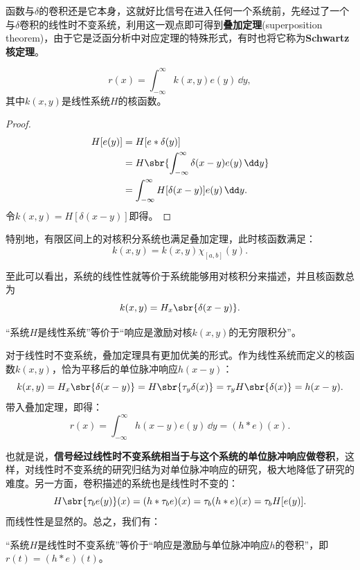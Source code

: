 函数与$\delta$的卷积还是它本身，这就好比信号在进入任何一个系统前，先经过了一个与$\delta$卷积的线性时不变系统，利用这一观点即可得到\textbf{叠加定理}(superposition theorem)\cite{brad_osgood_ee261}，由于它是泛函分析中对应定理的特殊形式，有时也将它称为\textbf{Schwartz核定理}。
\begin{theorem}\label{thm:superposition}
    \begin{equation}
        r(x)=\int_{-\infty}^{\infty}k(x,y)e(y)\,\dd y,
    \end{equation}
    其中$k(x,y)$是线性系统$H$的核函数。
\end{theorem}
\begin{proof}
    \begin{align}
        H[e(y)]&=H[e*\delta(y)]\nonumber\\
        &=H\sbr{\int_{-\infty}^{\infty}\delta(x-y)e(y)\,\dd y}\nonumber\\
        &=\int_{-\infty}^{\infty}H[\delta(x-y)]e(y)\,\dd y.
    \end{align}
    令$k(x,y)=H[\delta(x-y)]$即得。
\end{proof}

特别地，有限区间上的对核积分系统也满足叠加定理，此时核函数满足：
\begin{equation}
    k(x,y)=k(x,y)\chi_{[a,b]}(y).
\end{equation}

至此可以看出，系统的线性性就等价于系统能够用对核积分来描述，并且核函数总为
\begin{equation}
    k(x,y)=H_x\sbr{\delta(x-y)}.
\end{equation}

\begin{proposition}[线性系统的等价定义]
    “系统$H$是线性系统”等价于“响应是激励对核$k(x,y)$的无穷限积分”。
\end{proposition}

对于线性时不变系统，叠加定理具有更加优美的形式。作为线性系统而定义的核函数$k(x,y)$，恰为平移后的单位脉冲响应$h(x-y)$：
\begin{equation}
    k(x,y)=H_x\sbr{\delta(x-y)}=H\sbr{\tau_y\delta(x)}=\tau_y H\sbr{\delta(x)}=h(x-y).
\end{equation}
带入叠加定理，即得：
\begin{equation}
    r(x)=\int_{-\infty}^{\infty}h(x-y)e(y)\,\dd y=(h*e)(x).
\end{equation}

也就是说，\textbf{信号经过线性时不变系统相当于与这个系统的单位脉冲响应做卷积}，这样，对线性时不变系统的研究归结为对单位脉冲响应的研究，极大地降低了研究的难度。另一方面，卷积描述的系统也是线性时不变的：
\begin{equation}
    H\sbr{\tau_b e(y)}(x)=(h*\tau_b e)(x)=\tau_b(h*e)(x)=\tau_b H[e(y)].
\end{equation}
而线性性是显然的。总之，我们有：
\begin{proposition}[线性时不变系统的等价定义]
    \label{prop:LTI_conv}
    “系统$H$是线性时不变系统”等价于“响应是激励与单位脉冲响应$h$的卷积”，即$r(t)=(h*e)(t)$。
\end{proposition}

